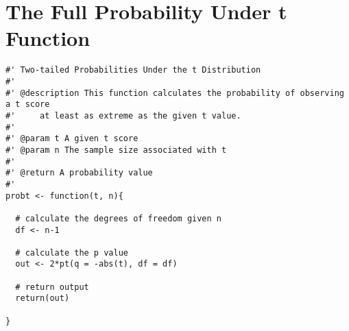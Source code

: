 \documentclass{tufte-handout}
\begin{document}
\newpage
\section{The Full Probability Under t Function}
\begin{verbatim}
#' Two-tailed Probabilities Under the t Distribution
#' 
#' @description This function calculates the probability of observing a t score
#'     at least as extreme as the given t value.
#'     
#' @param t A given t score
#' @param n The sample size associated with t
#'
#' @return A probability value     
#'      
probt <- function(t, n){
 
  # calculate the degrees of freedom given n
  df <- n-1
  
  # calculate the p value
  out <- 2*pt(q = -abs(t), df = df)
  
  # return output
  return(out)
   
}
\end{verbatim}


\end{document}
